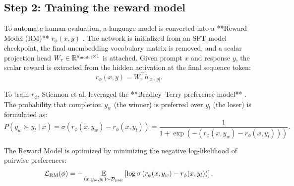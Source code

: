 \documentclass[../../main.tex]{subfiles}
\begin{document}
\subsection{Step 2: Training the reward model}
\label{subsec:step2_training_reward_model}

To automate human evaluation, a language model is converted into a **Reward Model (RM)** $r_\phi(x, y)$ \citep{xiao2025}. The network is initialized from an SFT model checkpoint, the final unembedding vocabulary matrix is removed, and a scalar projection head $W_r \in \mathbb{R}^{d_{\text{model}} \times 1}$ is attached. Given prompt $x$ and response $y$, the scalar reward is extracted from the hidden activation at the final sequence token:
\begin{equation}
r_\phi(x, y) = W_r^\top h_{|x \circ y|}.
\end{equation}

To train $r_\phi$, Stiennon et al. leveraged the **Bradley--Terry preference model** \citep{bradley1952}. The probability that completion $y_w$ (the winner) is preferred over $y_l$ (the loser) is formulated as:
\begin{equation}
\label{eq:bradley_terry_probability_formula}
P(y_w \succ y_l \mid x) = \sigma\left(r_\phi(x, y_w) - r_\phi(x, y_l)\right) = \frac{1}{1 + \exp\left(-\left(r_\phi(x, y_w) - r_\phi(x, y_l)\right)\right)}.
\end{equation}

The Reward Model is optimized by minimizing the negative log-likelihood of pairwise preferences:
\begin{equation}
\label{eq:rm_ranking_loss_explicit}
\mathcal{L}_{\text{RM}}(\phi) = -\operatorname*{\mathbb{E}}_{(x, y_w, y_l) \sim \mathcal{D}_{\text{pair}}} \left[ \log \sigma\left( r_\phi(x, y_w) - r_\phi(x, y_l) \right) \right].
\end{equation}
\end{document}
